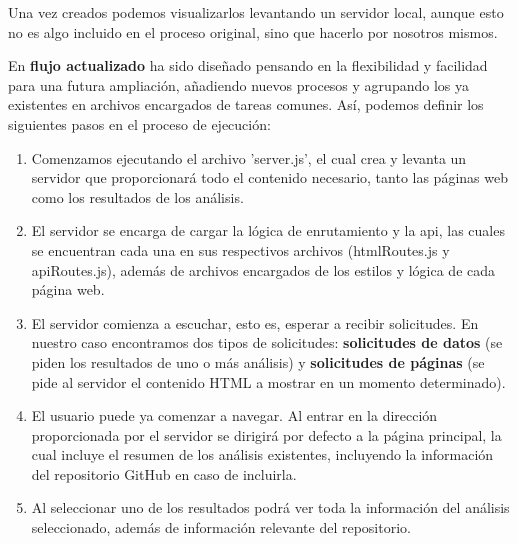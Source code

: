 \documentclass[a4paper, 12pt]{book}
\begin{document}
Una vez creados podemos visualizarlos levantando un servidor local, aunque esto no es algo incluido en el proceso original, sino que hacerlo por nosotros mismos.

En \textbf{flujo actualizado} ha sido diseñado pensando en la flexibilidad y facilidad para una futura ampliación, añadiendo nuevos procesos y agrupando los ya existentes en archivos encargados de tareas comunes. Así, podemos definir los siguientes pasos en el proceso de ejecución:

\begin{enumerate}
    \item  Comenzamos ejecutando el archivo 'server.js', el cual crea y levanta un servidor que proporcionará todo el contenido necesario, tanto las páginas web como los resultados de los análisis. 
    
    \item El servidor se encarga de cargar la lógica de enrutamiento y la api, las cuales se encuentran cada una en sus respectivos archivos (htmlRoutes.js y apiRoutes.js), además de archivos encargados de los estilos y lógica de cada página web.

    \item El servidor comienza a escuchar, esto es, esperar a recibir solicitudes. En nuestro caso encontramos dos tipos de solicitudes: \textbf{solicitudes de datos} (se piden los resultados de uno o más análisis) y \textbf {solicitudes de páginas} (se pide al servidor el contenido HTML a mostrar en un momento determinado).

    \item El usuario puede ya comenzar a navegar. Al entrar en la dirección proporcionada por el servidor se dirigirá por defecto a la página principal, la cual incluye el resumen de los análisis existentes, incluyendo la información del repositorio GitHub en caso de incluirla.

    \item Al seleccionar uno de los resultados podrá ver toda la información del análisis seleccionado, además de información relevante del repositorio.
    
\end{enumerate}
\end{document}
